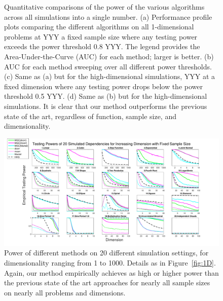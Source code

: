 \documentclass[11pt]{article}
\begin{document}
\begin{figure}[htbp]
{}
\caption{Quantitative comparisons of the power of the various algorithms across all simulations into a single number.  
(a) Performance profile plots comparing the different algorithms on all 1-dimensional problems at YYY a fixed sample size where any testing power exceeds the power threshold 0.8 YYY. The legend provides the Area-Under-the-Curve (AUC) for each method; larger is better.
(b) AUC for each method sweeping over all different power thresholds.
(c) Same as (a) but for the high-dimensional simulations, YYY at a fixed dimension where any testing power drops below the power threshold 0.5 YYY.
(d) Same as (b) but for the high-dimensional simulations.
It is clear that our method outperforms the previous state of the art, regardless of function, sample size, and dimensionality.}
\label{fig:pp}
\end{figure}


\begin{figure}[htbp]
\includegraphics[width=1.0\textwidth]{../Figures/Fig5}
\caption{Power of different methods on 20 different simulation settings, for dimensionality ranging from 1 to 1000.  Details as in Figure~\ref{fig:1D}.
Again, our method empirically achieves as high or higher power than the previous state of the art approaches for nearly all sample sizes on nearly all problems and dimensions.
}
\label{fig:nD}
\end{figure}
\end{document}
